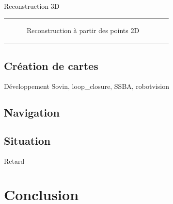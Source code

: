 \documentclass{beamer}
\begin{document}
\begin{frame}{Reconstruction 3D}
\begin{tabular}{c c}
\begin{minipage}{0.5\linewidth}
\begin{figure}
        \caption{Reconstruction à partir des points 2D}
      \end{figure}
    \end{minipage}
  \end{tabular}
\end{frame}

\subsection*{Création de cartes}
\begin{frame}{Développement}
  Sovin, loop\_closure, SSBA, robotvision
\end{frame}

\subsection*{Navigation}
\begin{frame}

\end{frame}

\subsection*{Situation}
\begin{frame}
  Retard
\end{frame}


\section{Conclusion}
\end{document}
